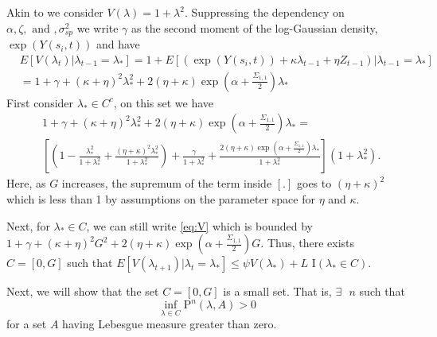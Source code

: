 \documentclass[11pt]{isuthesis}
\begin{document}
Akin to \cite{fokianos2009poisson} we consider $V(\lambda)=1+\lambda^2$.  Suppressing the dependency on $\alpha, \zeta,\mbox{ and },\sigma_{sp}^2$ we write $\gamma$ as the second moment of the log-Gaussian density, $\exp(Y(s_i,t))$ and have
\begin{align}
	& E[V(\lambda_t)|\lambda_{t-1}=\lambda_*]= 1+E[\left(\exp(Y(s_i,t))+\kappa\lambda_{t-1}+\eta Z_{t-1}\right)|\lambda_{t-1}=\lambda_*]\\
	& = 1+\gamma+(\kappa+\eta)^2\lambda_*^2+2(\eta+\kappa)\exp(\alpha+\frac{\Sigma_{1,1}}{2})\lambda_* \label{eq:V}
\end{align}
First consider $\lambda_* \in C^c$, on this set we have
\begin{align}
	& 1+\gamma+(\kappa+\eta)^2\lambda_*^2+2(\eta+\kappa)\exp(\alpha+\frac{\Sigma_{1,1}}{2})\lambda_* =\nonumber\\ & \left[\left(1-\frac{\lambda_*^2}{1+\lambda_*^2}+\frac{(\eta+\kappa)^2 \lambda_*^2}{1+\lambda_*^2}\right) + \frac{\gamma}{1+\lambda_*^2}+\frac{2(\eta+\kappa)\exp(\alpha+\frac{\Sigma_{1,1}}{2})\lambda_*}{1+\lambda_*^2}\right](1+\lambda_*^2).
\end{align}
Here, as $G$ increases, the supremum of the term inside $\left[.\right]$ goes to $(\eta+\kappa)^2$ which is less than 1 by assumptions on the parameter space for $\eta$ and $\kappa$.  

Next, for $\lambda_* \in C$, we can still write \eqref{eq:V} which is bounded by $1+\gamma+(\kappa+\eta)^2 G^2 + 2(\eta+\kappa)\exp(\alpha+\frac{\Sigma_{1,1}}{2})G$.  Thus, there exists $C=[0,G]$ such that $E[V(\lambda_{t+1})|\lambda_t=\lambda_*]\leq \psi V(\lambda_*)+L \mbox{ I}(\lambda_*\in C)$.

Next, we will show that the set $C=[0,G]$ is a small set.  That is, $\exists \mbox{ }n$ such that
\begin{equation}
	\inf_{\lambda \in C}\mbox{P}^n(\lambda,A)>0
\end{equation}
for a set $A$ having Lebesgue measure greater than zero.
\end{document}
